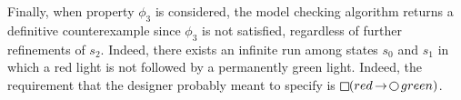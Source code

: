 Finally, when property $\phi_3$ is considered, the model checking algorithm returns a definitive counterexample since $\phi_3$ is not satisfied, regardless of further refinements of $s_2$. Indeed, there exists an infinite run among states $s_0$ and $s_1$ in which a red light is not followed by a permanently green light. Indeed, the requirement that the designer probably meant to specify is $\LTLglobally (red \LTLimplication \LTLnext green)$.



%
%
%

